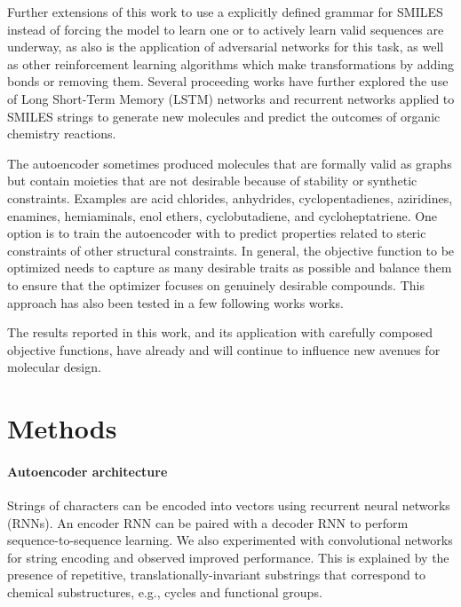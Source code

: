 Further extensions of this work to use a explicitly defined grammar for SMILES instead of forcing the model to learn one\cite{kusner2017grammar} or to actively learn valid sequences\cite{Janz2017,jaques2017sequence} are underway, as also is the application of adversarial networks for this task,\cite{guimaraes2017objective, Sanchez-Lengeling2017,blaschke2017application} as well as other reinforcement learning algorithms which make transformations by adding bonds or removing them.\cite{Zhou2018Optimization}
Several proceeding works have further explored the use of Long Short-Term Memory (LSTM) networks and recurrent networks applied to SMILES strings to generate new molecules\cite{yang2017chemts,segler2017generating} and predict the outcomes of organic chemistry reactions.\cite{liu2017retrosynthetic}

The autoencoder sometimes produced molecules that are formally valid as graphs but contain moieties that are not desirable because of stability or synthetic constraints.  Examples are acid chlorides, anhydrides, cyclopentadienes, aziridines, enamines, hemiaminals, enol ethers, cyclobutadiene, and cycloheptatriene. One option is to train the autoencoder with to predict properties related to steric constraints of other structural constraints. In general, the objective function to be optimized needs to capture as many desirable traits as possible and balance them to ensure that the optimizer focuses on genuinely desirable compounds. This approach has also been tested in a few following works works.\cite{Janz2017,jaques2017sequence}

The results reported in this work, and its application with carefully composed objective functions, have already and will continue to influence new avenues for molecular design.

\section{Methods}

\paragraph{Autoencoder architecture}
Strings of characters can be encoded into vectors using recurrent neural networks (RNNs).
An encoder RNN can be paired with a decoder RNN to perform sequence-to-sequence learning.\cite{sutskever2014sequence}
We also experimented with convolutional networks for string encoding\cite{KalchbrennerACL2014} and observed improved performance.
This is explained by the presence of repetitive, translationally-invariant substrings that correspond to chemical substructures, e.g., cycles and functional groups.

